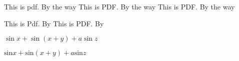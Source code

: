 \documentclass[twocolumn]{article}
\begin{document}
  This is pdf. By the way \clearpage
  This is PDF. By the way \clearpage
  This is PDF\@. By the way \clearpage

  \begin{flushright}
    This is Pdf. By\clearpage
    This is PDF\@. By
  \end{flushright}

  $\sin x + \sin(x+y) + a\sin z$

  $\mathrm{sin} x + \mathrm{sin}(x+y) + a\mathrm{sin}z$
\end{document}

